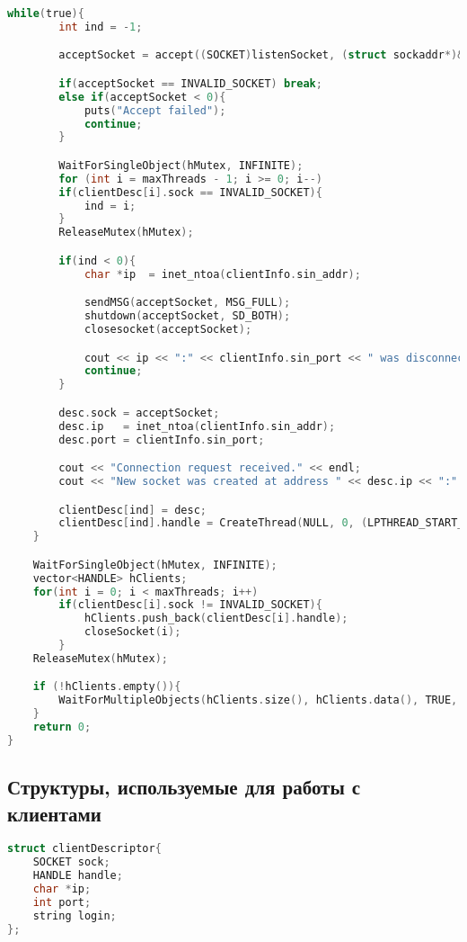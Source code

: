 \begin{append}
\begin{lstlisting}[language=C, label=lst:createserver]
    while(true){
        int ind = -1;

        acceptSocket = accept((SOCKET)listenSocket, (struct sockaddr*)&clientInfo, &clientInfoSize);

        if(acceptSocket == INVALID_SOCKET) break;
        else if(acceptSocket < 0){
            puts("Accept failed");
            continue;
        }

        WaitForSingleObject(hMutex, INFINITE);
        for (int i = maxThreads - 1; i >= 0; i--)
        if(clientDesc[i].sock == INVALID_SOCKET){
            ind = i;
        }
        ReleaseMutex(hMutex);

        if(ind < 0){
            char *ip  = inet_ntoa(clientInfo.sin_addr);

            sendMSG(acceptSocket, MSG_FULL);
            shutdown(acceptSocket, SD_BOTH);
            closesocket(acceptSocket);

            cout << ip << ":" << clientInfo.sin_port << " was disconnected because of server overload" << endl;
            continue;
        }

        desc.sock = acceptSocket;
        desc.ip   = inet_ntoa(clientInfo.sin_addr);
        desc.port = clientInfo.sin_port;

        cout << "Connection request received." << endl;
        cout << "New socket was created at address " << desc.ip << ":" << desc.port << endl;

        clientDesc[ind] = desc;
        clientDesc[ind].handle = CreateThread(NULL, 0, (LPTHREAD_START_ROUTINE)clientProcess, (void *)desc.sock, 0, NULL);
    }

    WaitForSingleObject(hMutex, INFINITE);
    vector<HANDLE> hClients;
    for(int i = 0; i < maxThreads; i++)
        if(clientDesc[i].sock != INVALID_SOCKET){
            hClients.push_back(clientDesc[i].handle);
            closeSocket(i);
        }
    ReleaseMutex(hMutex);

    if (!hClients.empty()){
        WaitForMultipleObjects(hClients.size(), hClients.data(), TRUE, INFINITE);
    }
    return 0;
}
\end{lstlisting}

\subsection{Структуры, используемые для работы с клиентами} \label{app:struct}

\begin{lstlisting}[language=C, label=lst:createserver]
struct clientDescriptor{
    SOCKET sock;
    HANDLE handle;
    char *ip;
    int port;
    string login;
};


\end{lstlisting}
\end{append}
